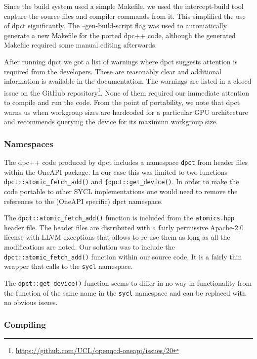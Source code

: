 Since the build system used a simple Makefile, we used the intercept-build tool capture the source files and compiler commands from it.
This simplified the use of dpct significantly.
The --gen-build-script flag was used to automatically generate a new Makefile for the ported dpc++ code, although the generated Makefile required some manual editing afterwards.

After running dpct we got a list of warnings where dpct suggests attention is required from the developers.
These are reasonably clear and additional information is available in the documentation.
The warnings are listed in a closed issue on the GitHub repository\footnote{\url{https://github.com/UCL/openqcd-oneapi/issues/20}}.
None of them required our immediate attention to compile and run the code.
From the point of portability, we note that dpct warns us when workgroup sizes are hardcoded for a particular GPU architecture and recommends querying the device for its maximum workgroup size.

\subsubsection{Namespaces}\label{sec:openqcd_namespaces}

The dpc++ code produced by dpct includes a namespace \texttt{dpct} from header files within the OneAPI package.
In our case this was limited to two functions \verb!dpct::atomic_fetch_add()! and \verb!{dpct::get_device()!.
In order to make the code portable to other SYCL implementations one would need to remove the references to the (OneAPI specific) dpct namespace.

The \verb!dpct::atomic_fetch_add()! function is included from the \texttt{atomics.hpp} header file.
The header files are distributed with a fairly permissive Apache-2.0 license with LLVM exceptions that allows to re-use them as long as all the modifications are noted.
Our solution was to include the \verb!dpct::atomic_fetch_add()! function within our source code.
It is a fairly thin wrapper that calls to the \texttt{sycl} namespace.

The \verb!dpct::get_device()! function seems to differ in no way in functionality from the function of the same name in the \texttt{sycl} namespace and can be replaced with no obvious issues.

\subsubsection{Compiling}\label{sec:openqcd_compiling}

